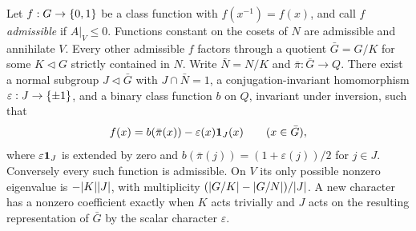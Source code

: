 \begin{theorem}\label{nab:thm:binary}
Let $f:G\to\{0,1\}$ be a class function with $f(x^{-1})=f(x)$, and call $f$
\emph{admissible} if $A|_V\le0$. Functions constant on the cosets of $N$ are admissible and
annihilate $V$. Every other admissible $f$ factors through a quotient $\bar G=G/K$ for some
$K\triangleleft G$ strictly contained in $N$. Write $\bar N=N/K$ and $\bar\pi:\bar G\to Q$.
There exist a normal subgroup $J\triangleleft\bar G$ with $J\cap\bar N=1$, a
conjugation-invariant homomorphism $\varepsilon:J\to\{\pm1\}$, and a binary class function
$b$ on $Q$, invariant under inversion, such that
\begin{equation}\label{nab:eq:binary}
 f(x)=b(\bar\pi(x))-\varepsilon(x)\mathbf{1}_J(x)\qquad(x\in\bar G),
\end{equation}
where $\varepsilon\mathbf{1}_J$ is extended by zero and
$b(\bar\pi(j))=(1+\varepsilon(j))/2$ for $j\in J$. Conversely every such function is
admissible. On $V$ its only possible nonzero eigenvalue is $-\lvert K\rvert\lvert J\rvert$, with
multiplicity $(\lvert G/K\rvert-\lvert G/N\rvert)/\lvert J\rvert$. A new character has a nonzero coefficient
exactly when $K$ acts trivially and $J$ acts on the resulting representation of $\bar G$ by
the scalar character $\varepsilon$.
\end{theorem}
